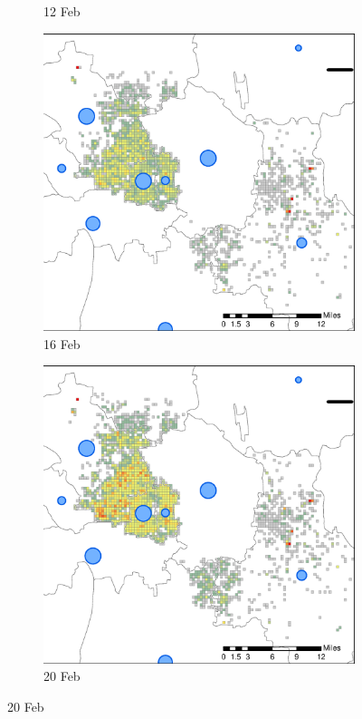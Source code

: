 \documentclass[preprints,ijgi,submit,moreauthors]{Definitions/mdpi}
\begin{document}
\begin{figure}[H]
\begin{subfigure}{.23\textwidth}
        \caption{12 Feb}
    \end{subfigure}
    \begin{subfigure}{.23\textwidth}
        \includegraphics[width=\textwidth]{Figures/Figure7/NewDistrictSSBD2020_02_16.eps}
        \caption{16 Feb}
    \end{subfigure}
        \begin{subfigure}{.23\textwidth}
        \includegraphics[width=\textwidth]{Figures/Figure7/NewDistrictSSBD2020_02_20.eps}
        \caption{20 Feb}
    \end{subfigure}
    

\end{figure}
\end{document}
